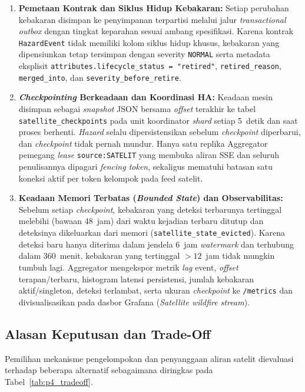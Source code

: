 \begin{enumerate}
    \item \textbf{Pemetaan Kontrak dan Siklus Hidup Kebakaran:} Setiap perubahan kebakaran disimpan ke penyimpanan terpartisi melalui jalur \textit{transactional outbox} dengan tingkat keparahan sesuai ambang spesifikasi. Karena kontrak \texttt{HazardEvent} tidak memiliki kolom siklus hidup khusus, kebakaran yang dipensiunkan tetap tersimpan dengan severity \texttt{NORMAL} serta metadata eksplisit \texttt{attributes.lifecycle\_status = "retired"}, \texttt{retired\_reason}, \texttt{merged\_into}, dan \texttt{severity\_before\_retire}.
    \item \textbf{\textit{Checkpointing} Berkeadaan dan Koordinasi HA:} Keadaan mesin disimpan sebagai \textit{snapshot} JSON bersama \textit{offset} terakhir ke tabel \texttt{satellite\_checkpoints} pada unit koordinator \textit{shard} setiap 5~detik dan saat proses berhenti. \textit{Hazard} selalu dipersistensikan sebelum \textit{checkpoint} diperbarui, dan \textit{checkpoint} tidak pernah mundur. Hanya satu replika Aggregator pemegang \textit{lease} \texttt{source:SATELIT} yang membuka aliran SSE dan seluruh penulisannya dipagari \textit{fencing token}, sekaligus mematuhi batasan satu koneksi aktif per token kelompok pada feed satelit.
    \item \textbf{Keadaan Memori Terbatas (\textit{Bounded State}) dan Observabilitas:} Sebelum setiap \textit{checkpoint}, kebakaran yang deteksi terbarunya tertinggal melebihi  (bawaan 48~jam) dari waktu kejadian terbaru ditutup dan deteksinya dikeluarkan dari memori (\texttt{satellite\_state\_evicted}). Karena deteksi baru hanya diterima dalam jendela 6~jam \textit{watermark} dan terhubung dalam 360~menit, kebakaran yang tertinggal $>12$~jam tidak mungkin tumbuh lagi. Aggregator mengekspor metrik \textit{lag} event, \textit{offset} terapan/terbaru, histogram latensi persistensi, jumlah kebakaran aktif/singleton, deteksi terlambat, serta ukuran \textit{checkpoint} ke \texttt{/metrics} dan divisualisasikan pada dasbor Grafana (\textit{Satellite wildfire stream}).
\end{enumerate}

\vspace{1em}

\subsection{Alasan Keputusan dan Trade-Off}
Pemilihan mekanisme pengelompokan dan penyanggaan aliran satelit dievaluasi terhadap beberapa alternatif sebagaimana diringkas pada Tabel~\ref{tab:p4_tradeoff}.

